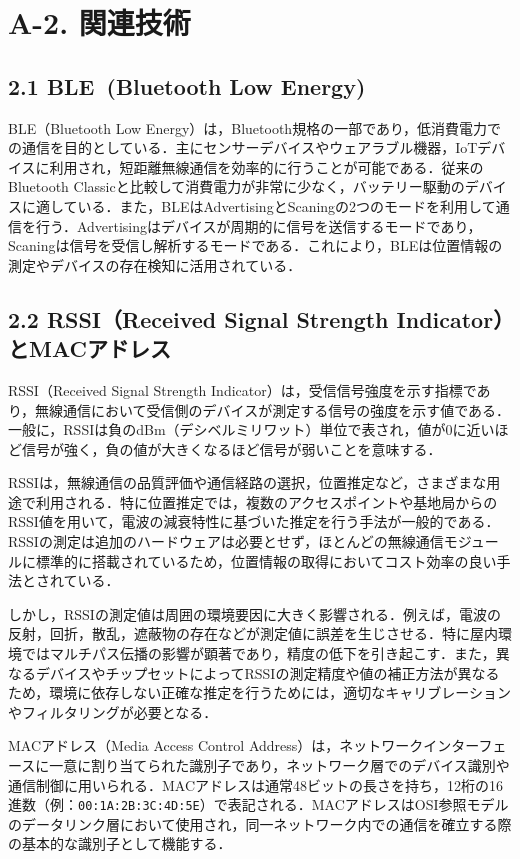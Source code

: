 \section*{A-2. 関連技術}

\subsection*{2.1 BLE\ (Bluetooth Low Energy)}
BLE（Bluetooth Low Energy）は，Bluetooth規格の一部であり，低消費電力での通信を目的としている\cite{ble}．主にセンサーデバイスやウェアラブル機器，IoTデバイスに利用され，短距離無線通信を効率的に行うことが可能である．従来のBluetooth Classicと比較して消費電力が非常に少なく，バッテリー駆動のデバイスに適している\cite{ble}．また，BLEはAdvertisingとScaningの2つのモードを利用して通信を行う\cite{ble}．Advertisingはデバイスが周期的に信号を送信するモードであり，Scaningは信号を受信し解析するモードである．これにより，BLEは位置情報の測定やデバイスの存在検知に活用されている．

\subsection*{2.2 RSSI（Received Signal Strength Indicator）とMACアドレス}
RSSI（Received Signal Strength Indicator）は，受信信号強度を示す指標であり，無線通信において受信側のデバイスが測定する信号の強度を示す値である\cite{ble}．一般に，RSSIは負のdBm（デシベルミリワット）単位で表され，値が0に近いほど信号が強く，負の値が大きくなるほど信号が弱いことを意味する．

RSSIは，無線通信の品質評価や通信経路の選択，位置推定など，さまざまな用途で利用される．特に位置推定では，複数のアクセスポイントや基地局からのRSSI値を用いて，電波の減衰特性に基づいた推定を行う手法が一般的である．RSSIの測定は追加のハードウェアは必要とせず，ほとんどの無線通信モジュールに標準的に搭載されているため，位置情報の取得においてコスト効率の良い手法とされている．

しかし，RSSIの測定値は周囲の環境要因に大きく影響される\cite{ble}．例えば，電波の反射，回折，散乱，遮蔽物の存在などが測定値に誤差を生じさせる．特に屋内環境ではマルチパス伝播の影響が顕著であり，精度の低下を引き起こす．また，異なるデバイスやチップセットによってRSSIの測定精度や値の補正方法が異なるため，環境に依存しない正確な推定を行うためには，適切なキャリブレーションやフィルタリングが必要となる．


MACアドレス（Media Access Control Address）は，ネットワークインターフェースに一意に割り当てられた識別子であり，ネットワーク層でのデバイス識別や通信制御に用いられる\cite{tanenbaum}．MACアドレスは通常48ビットの長さを持ち，12桁の16進数（例：\texttt{00:1A:2B:3C:4D:5E}）で表記される．MACアドレスはOSI参照モデル\cite{tanenbaum}のデータリンク層において使用され，同一ネットワーク内での通信を確立する際の基本的な識別子として機能する．

